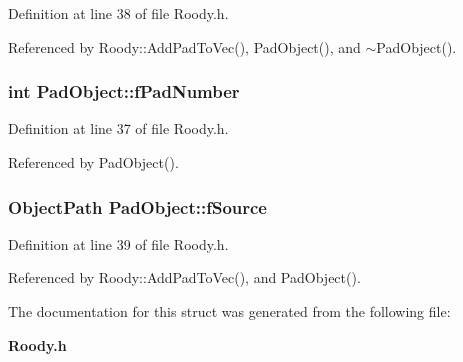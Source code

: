 Definition at line 38 of file Roody.h.

Referenced by Roody::AddPadToVec(), PadObject(), and $\sim$PadObject().
\subsubsection[{fPadNumber}]{\setlength{\rightskip}{0pt plus 5cm}int {\bf PadObject::fPadNumber}}\label{structPadObject_a78bdb3cf0d4a4dcf1f22900548ebe7b0}


Definition at line 37 of file Roody.h.

Referenced by PadObject().
\subsubsection[{fSource}]{\setlength{\rightskip}{0pt plus 5cm}ObjectPath {\bf PadObject::fSource}}\label{structPadObject_ab27c0263b342ca18b2f7bc498d8b3f92}


Definition at line 39 of file Roody.h.

Referenced by Roody::AddPadToVec(), and PadObject().

The documentation for this struct was generated from the following file:\begin{DoxyCompactItemize}
\item 
{\bf Roody.h}\end{DoxyCompactItemize}
